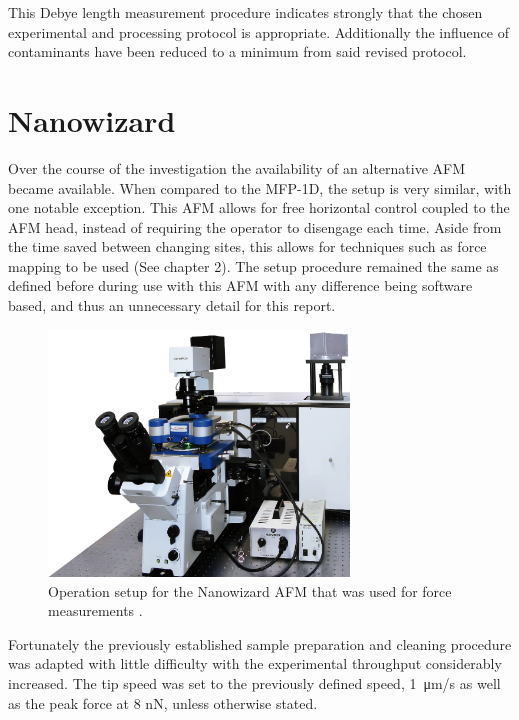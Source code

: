 This Debye length measurement procedure indicates strongly that the chosen experimental and processing protocol is appropriate. Additionally the influence of contaminants have been reduced to a minimum from said revised protocol.

\newpage

\section{Nanowizard}

Over the course of the investigation the availability of an alternative AFM became available. When compared to the MFP-1D, the setup is very similar, with one notable exception. This AFM allows for free horizontal control coupled to the AFM head, instead of requiring the operator to disengage each time. Aside from the time saved between changing sites, this allows for techniques such as force mapping to be used (See chapter 2). The setup procedure remained the same as defined before during use with this AFM with any difference being software based, and thus an unnecessary detail for this report. 

\begin{figure}[h!]     
        \begin{center}
          \includegraphics[width=80mm]{chapter4/Nanowizard.png}
\end{center}
\caption{Operation setup for the Nanowizard AFM that was used for force measurements \cite{NWizardPic}.}
\label{fig:Nanowizard.png}                 
\end{figure}

Fortunately the previously established sample preparation and cleaning procedure was adapted with little difficulty with the experimental throughput considerably increased. The tip speed was set to the previously defined speed, \SI{1}{\micro\metre/s} as well as the peak force at 8 nN, unless otherwise stated.

